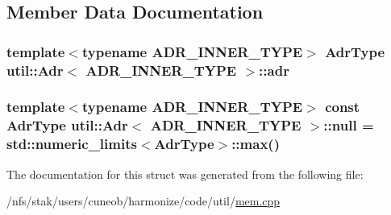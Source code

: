 \subsection{Member Data Documentation}
\hypertarget{structutil_1_1Adr_a6cb4bfd249048c884be0aedd7f83c524}{
\subsubsection[{adr}]{\setlength{\rightskip}{0pt plus 5cm}template$<$typename A\-D\-R\-\_\-\-I\-N\-N\-E\-R\-\_\-\-T\-Y\-P\-E$>$ {\bf Adr\-Type} {\bf util\-::\-Adr}$<$ A\-D\-R\-\_\-\-I\-N\-N\-E\-R\-\_\-\-T\-Y\-P\-E $>$\-::adr}}\label{structutil_1_1Adr_a6cb4bfd249048c884be0aedd7f83c524}
\hypertarget{structutil_1_1Adr_a9a09c97d346a91e3ede256eafd6c79dd}{
\subsubsection[{null}]{\setlength{\rightskip}{0pt plus 5cm}template$<$typename A\-D\-R\-\_\-\-I\-N\-N\-E\-R\-\_\-\-T\-Y\-P\-E$>$ const {\bf Adr\-Type} {\bf util\-::\-Adr}$<$ A\-D\-R\-\_\-\-I\-N\-N\-E\-R\-\_\-\-T\-Y\-P\-E $>$\-::null = std\-::numeric\-\_\-limits$<${\bf Adr\-Type}$>$\-::max()\hspace{0.3cm}{\ttfamily [static]}}}\label{structutil_1_1Adr_a9a09c97d346a91e3ede256eafd6c79dd}


The documentation for this struct was generated from the following file\-:\begin{DoxyCompactItemize}
\item 
/nfs/stak/users/cuneob/harmonize/code/util/\hyperlink{mem_8cpp}{mem.\-cpp}\end{DoxyCompactItemize}
